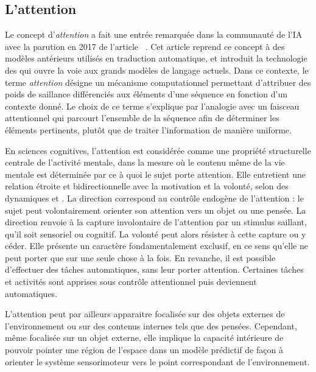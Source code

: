 \subsection{L'attention}
\label{sec:attention}

\noindent
Le concept d'\emph{attention} a fait une entrée remarquée dans la communauté de l'IA avec la parution en 2017 de l'article \og {} \fg\  \cite{vaswani_attention_2017}.  
Cet article reprend ce concept à des modèles antérieurs utilisés en traduction automatique, et introduit la technologie des  qui ouvre la voie aux grands modèles de langage actuels.
Dans ce contexte, le terme \emph{attention} désigne un mécanisme computationnel permettant d'attribuer des poids de saillance différenciés aux éléments d'une séquence en fonction d'un contexte donné. 
Le choix de ce terme s’explique par l’analogie avec un faisceau attentionnel qui parcourt l’ensemble de la séquence afin de déterminer les éléments pertinents, plutôt que de traiter l’information de manière uniforme.

En sciences cognitives, l'attention est considérée comme une propriété structurelle centrale de l'activité mentale, dans la mesure où le contenu même de la vie mentale est déterminée par ce à quoi le sujet porte attention.
Elle entretient une relation étroite et bidirectionnelle avec la motivation et la volonté, selon des dynamiques  et .
La direction  correspond au contrôle endogène de l'attention : le sujet peut volontairement orienter son attention vers un objet ou une pensée. 
La direction  renvoie à la capture involontaire de l'attention par un stimulus saillant, qu'il soit sensoriel ou cognitif. 
La volonté peut alors résister à cette capture ou y céder. 
Elle présente un caractère fondamentalement exclusif, en ce sens qu'elle ne peut porter que sur une seule chose à la fois. 
En revanche, il est possible d'effectuer des tâches automatiques, sans leur porter attention.
Certaines tâches et activités sont apprises sous contrôle attentionnel puis deviennent automatiques.  

L’attention peut par ailleurs apparaitre focalisée sur des objets externes de l'environnement ou sur des contenus internes tels que des pensées. 
Cependant, même focalisée sur un objet externe, elle implique la capacité intérieure de pouvoir pointer une région de l'espace dans un modèle prédictif de façon à orienter le système sensorimoteur vers le point correspondant de l'environnement.

